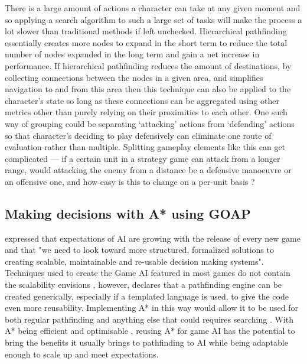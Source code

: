 \documentclass[11pt, a4paper]{report}
\begin{document}
There is a large amount of actions a character can take at any given moment \parencite[62]{nareyek2004ai} and so applying a search algorithm to such a large set of tasks will make the process a lot slower than traditional methods if left unchecked. Hierarchical pathfinding essentially creates more nodes to expand in the short term to reduce the total number of nodes expanded in the long term and gain a net increase in performance. If hierarchical pathfinding reduces the amount of destinations, by collecting connections between the nodes in a given area, and simplifies navigation to and from this area then this technique can also be applied to the character's state so long as these connections can be aggregated using other metrics other than purely relying on their proximities to each other. One such way of grouping  could be separating `attacking' actions from `defending' actions so that character's deciding to play defensively can eliminate one route of evaluation rather than multiple. Splitting gameplay elements like this can get complicated --- if a certain unit in a strategy game can attack from a longer range, would attacking the enemy from a distance be a defensive manoeuvre or an offensive one, and how easy is this to change on a per-unit basis \parencite{weber2011building}?

\subsection{Making decisions with A* using GOAP}
\label{subsec:makingDecisionsWithAStarUsingGOAP}

\citeauthor{orkin2003applying} \parencite*[11]{orkin2003applying} expressed that expectations of AI are growing with the release of every new game and that "we need to look toward more structured, formalized solutions to creating scalable, maintainable and re-usable decision making systems". Techniques used to create the Game AI featured in most games do not contain the scalability \citeauthor{orkin2003applying} envisions \parencite[17]{laird2001human}, however, \citeauthor{higgins2002generic} \parencite*[117]{higgins2002generic} declares that a pathfinding engine can be created generically, especially if a templated language is used, to give the code even more reusability. Implementing A* in this way would allow it to be used for both regular pathfinding and anything else that could requires searching \parencite[120]{higgins2002generic}. With A* being efficient and optimisable \parencite[215]{millington2019ai}, reusing A* for game AI has the potential to bring the benefits it usually brings to pathfinding to AI while being adaptable enough to scale up and meet expectations.
\end{document}
